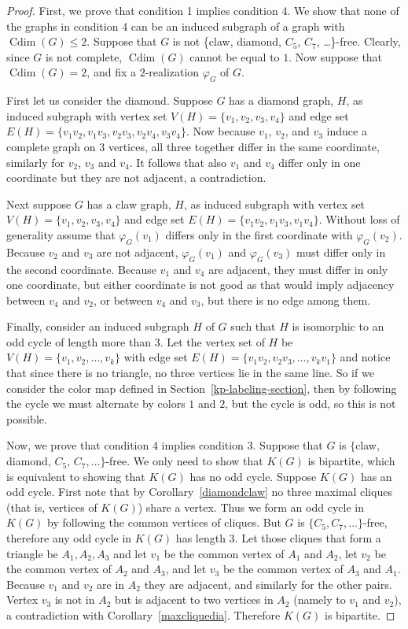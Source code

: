 \documentclass[12pt,a4paper,titlepage,openany]{report}
\DeclareMathOperator{\Cdim}{Cdim}
\begin{document}
\begin{proof}\sloppypar
First, we prove that condition 1 implies condition 4. We show that none of the graphs in condition 4 can be an induced subgraph of a graph with $\Cdim(G)\leq 2$. Suppose that $G$ is not \{claw, diamond, $C_5$, $C_7$, \ldots\}-free. Clearly, since $G$ is not complete, $\Cdim(G)$ cannot be equal to $1$. Now suppose that $\Cdim(G)=2$, and fix a $2$-realization $\varphi_G$ of $G$.

First let us consider the diamond. Suppose $G$ has a diamond graph, $H$, as induced subgraph with vertex set $V(H)=\{v_1,v_2,v_3,v_4\}$ and edge set $E(H)=\{v_1v_2,v_1v_3,v_2v_3,v_2v_4,v_3v_4\}$. Now because $v_1$, $v_2$, and $v_3$ induce a complete graph on $3$ vertices, all three together differ in the same coordinate, similarly for $v_2$, $v_3$ and $v_4$. It follows that also $v_1$ and $v_4$ differ only in one coordinate but they are not adjacent, a contradiction.

Next suppose $G$ has a claw graph, $H$, as induced subgraph with vertex set $V(H)=\{v_1,v_2,v_3,v_4\}$ and edge set $E(H)=\{v_1v_2,v_1v_3,v_1v_4\}$. Without loss of generality assume that $\varphi_G(v_1)$ differs only in the first coordinate with $\varphi_G(v_2)$. Because $v_2$ and $v_3$ are not adjacent, $\varphi_G(v_1)$ and $\varphi_G(v_3)$ must differ only in the second coordinate. Because $v_1$ and $v_4$ are adjacent, they must differ in only one coordinate, but either coordinate is not good as that would  imply adjacency between $v_4$ and $v_2$, or between $v_4$ and $v_3$, but there is no edge among them.

Finally, consider an induced subgraph $H$ of $G$ such that $H$ is isomorphic to an odd cycle of length more than 3. Let the vertex set of $H$ be $V(H)=\{v_1,v_2,\ldots,v_k\}$ with edge set $E(H)=\{v_1v_2,v_2v_3,\ldots ,v_kv_1\}$ and notice that since there is no triangle, no three vertices lie in the same line. So if we consider the color map defined in Section~\ref{kp-labeling-section}, then by following the cycle we must alternate by colors $1$ and $2$, but the cycle is odd, so this is not possible.

\medskip
Now, we prove that condition 4 implies condition 3. Suppose that $G$ is $\{$claw, diamond, $C_5$, $C_7, \ldots \}$-free. We only need to show that $K(G)$ is bipartite, which is equivalent to showing that $K(G)$ has no odd cycle. Suppose $K(G)$ has an odd cycle. First note that by Corollary~\ref{diamondclaw} no three maximal cliques (that is, vertices of $K(G)$) share a vertex.
Thus we form an odd cycle in $K(G)$ by following the common vertices of cliques. But $G$ is $\{C_5,C_7,\ldots\}$-free, therefore any odd cycle in $K(G)$ has length $3$. Let those cliques that form a triangle be $A_1,A_2,A_3$ and let $v_1$ be the common vertex of $A_1$ and $A_2$, let $v_2$ be the common vertex of $A_2$ and $A_3$, and let $v_3$ be the common vertex of $A_3$ and $A_1$.
Because $v_1$ and $v_2$ are in $A_2$ they are adjacent, and similarly for the other pairs. Vertex $v_3$ is not in $A_2$ but is adjacent to two vertices in $A_2$ (namely to $v_1$ and $v_2$), a contradiction with Corollary~\ref{maxcliquedia}. Therefore $K(G)$ is bipartite.


\end{proof}
\end{document}
